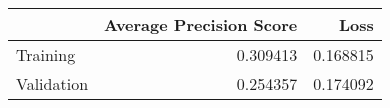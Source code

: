 \begin{tabular}{lrr}
\toprule
{} &  Average Precision Score &      Loss \\
\midrule
Training   &                 0.309413 &  0.168815 \\
Validation &                 0.254357 &  0.174092 \\
\bottomrule
\end{tabular}

